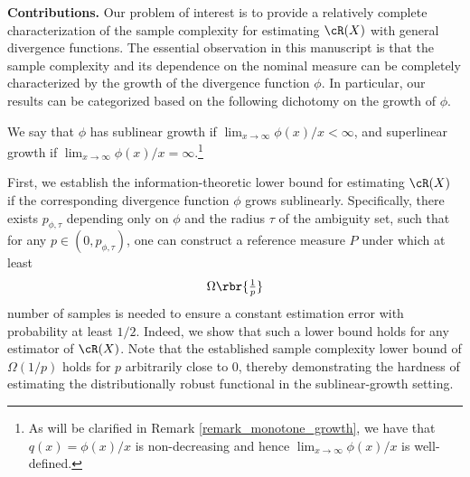 \documentclass[9pt]{article} %
\numberwithin{equation}{section}
\renewcommand{\frac}[2]{\tfrac{#1}{#2}}
\begin{document}
\vspace{0.05in}


{\bf Contributions.}
Our problem of interest is to provide a relatively complete characterization of the sample complexity for estimating $\cR(X)$ with general divergence functions.
The essential observation in this manuscript is that the sample complexity and its dependence on the nominal measure can be completely characterized by the growth of the divergence function $\phi$.
In particular, our results can be categorized based on the following dichotomy on the growth of $\phi$. 

\begin{definition}
We say that $\phi$ has sublinear growth if $\lim_{x \to \infty} \phi(x)/x < \infty$,
and superlinear growth if  $\lim_{x \to \infty} \phi(x)/x = \infty$.\footnote{
As will be clarified in Remark \ref{remark_monotone_growth},   we have that $q(x) = \phi(x)/x$ is non-decreasing and hence $\lim_{x \to \infty} \phi(x)/x$ is  well-defined.
}
\end{definition}


First, we establish the information-theoretic lower bound for estimating $\cR(X)$ if the corresponding divergence function $\phi$ grows sublinearly.
Specifically, there exists $p_{\phi, \tau}$ depending only on $\phi$ and the radius $\tau$ of the ambiguity set, such that 
for any $p \in (0, p_{\phi,\tau})$, one can construct a reference measure $P$ under which at least 
\begin{align}\label{intro_lower_sublinear}
\Omega \rbr{
\frac{1}{p}
}
\end{align}
number of samples is needed to ensure a constant estimation error with probability at least $1/2$.
Indeed, we show that such a lower bound holds for any estimator of $\cR(X)$.
Note that the established sample complexity lower bound of $\Omega(1/p)$ holds for $p$ arbitrarily close to $0$,
thereby demonstrating the hardness of estimating the distributionally robust functional in the sublinear-growth setting. 
\end{document}
